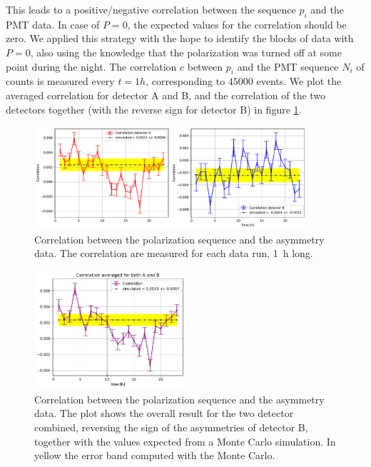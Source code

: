 This leads to a positive/negative correlation between the sequence $p_{i}$ and the PMT data. In case of $P = 0$, the expected values for the correlation should be zero.
We applied this strategy with the hope to identify the blocks of data with $P = 0$, also using the knowledge that the polarization was turned off at some point during the night. The correlation $c$ between $p_{i}$ and the PMT sequence $N_{i}$ of counts is measured every $t = 1 h$, corresponding to $45000$ events. We plot the averaged correlation for detector A and B, and the correlation of the two detectors together (with the reverse sign for detector B) in figure \ref{fig:PolarityCheck}.

\begin{figure}[!ht]
\centering
\includegraphics[width = 0.9\textwidth]{Analysis/Dataselection/Correlation.pdf}
\caption{Correlation between the polarization sequence and the asymmetry data. The correlation are measured for each data run, \SI{1}{\hour} long.}
\label{fig:PolarityCheck}
\end{figure}

\begin{figure}[!ht]
\centering
\includegraphics[width = 0.5\textwidth]{Analysis/Dataselection/OverallCorr.pdf}
\caption{Correlation between the polarization sequence and the asymmetry data. The plot shows the overall result for the two detector combined, reversing the sign of the asymmetries of detector B, together with the values expected from a Monte Carlo simulation. In yellow the error band computed with the Monte Carlo.}
\label{fig:PolarityCheck2}
\end{figure}


